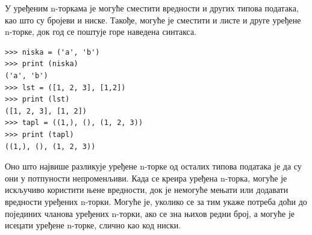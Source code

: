 У уређеним n-торкама је могуће сместити вредности и других типова података, као што су бројеви и ниске. Такође, могуће је сместити и листе и друге уређене n-торке, док год се поштује горе наведена синтакса.

\begin{lstlisting}[caption = Уређене n-торке могу садржати и ниске и  листе и друге уређене n-торке, label = str_lst_tuple]
>>> niska = ('a', 'b')
>>> print (niska)
('a', 'b')
>>> lst = ([1, 2, 3], [1,2])
>>> print (lst)
([1, 2, 3], [1, 2])
>>> tapl = ((1,), (), (1, 2, 3))
>>> print (tapl)
((1,), (), (1, 2, 3))
\end{lstlisting}

Оно што највише разликује уређене n-торке од осталих типова података је да су они у потпуности непроменљиви. Када се креира уређена n-торка, могуће је искључиво користити њене вредности, док је немогуће мењати или додавати вредности уређених n-торки. Могуће је, уколико се за тим укаже потреба доћи  до појединих чланова уређених n-торки, ако се зна њихов редни број, а могуће је исецати уређене n-торке, слично као код ниски.
